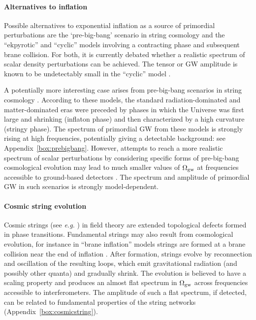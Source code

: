 \paragraph{Alternatives to inflation}

Possible alternatives to exponential inflation as a source 
of primordial perturbations are the `pre-big-bang' scenario in string cosmology 
and the ``ekpyrotic'' and ``cyclic'' models involving a contracting phase and 
subsequent brane collision. For both, it is currently debated whether a 
realistic spectrum of scalar density perturbations can be achieved. The 
tensor or GW amplitude is known to be undetectably small 
in the ``cyclic'' model \cite{Boyle:2003km}.

A potentially more interesting case arises from pre-big-bang scenarios in
string cosmology \cite{gas93,gas03}. According to these models, the
standard radiation-dominated and matter-dominated eras were preceded
by phases in which the Universe was first large and shrinking (inflaton phase)
and then characterized by a high curvature (stringy phase). The spectrum of
primordial GW from these models is strongly rising at high frequencies, 
potentially giving a detectable background: see Appendix~\ref{box:prebigbang}. 
However, attempts to reach a more realistic spectrum of scalar perturbations
by considering specific forms of pre-big-bang cosmological evolution may lead
to much smaller values of $\Omega_{\rm gw}$ at frequencies accessible to ground-based
detectors \cite{Cartier:2001gc}. The spectrum and amplitude of primordial GW in
such scenarios is strongly model-dependent.


\paragraph{Cosmic string evolution}

Cosmic strings (see {\em e.g.} \cite{Hindmarsh:1994re}) in field theory are extended topological defects formed in phase transitions. Fundamental strings may also result from cosmological evolution, for instance in ``brane inflation'' models \cite{Dvali:1998pa} strings are formed at a brane collision near the end of inflation \cite{Sarangi:2002yt}. After formation, strings evolve by reconnection and oscillation of the resulting loops, which emit gravitational radiation (and possibly other quanta) and gradually shrink. The evolution is believed to have a scaling property and produces an almost flat spectrum in $\Omega_{\rm gw}$ across frequencies accessible to interferometers. The amplitude of such a flat spectrum, if detected, can be related to fundamental properties of the string networks (Appendix~\ref{box:cosmicstring}).

